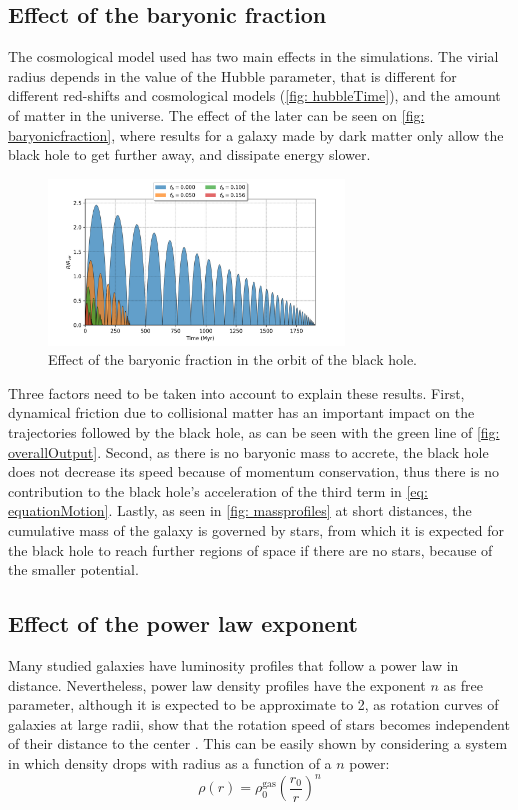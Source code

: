 	\subsection{Effect of the baryonic fraction}
	The cosmological model used has two main effects in the simulations. The virial radius depends in the value of the Hubble parameter, that is different for different red-shifts and cosmological models (\autoref{fig: hubbleTime}), and the amount of matter in the universe. The effect of the later can be seen on \autoref{fig: baryonicfraction}, where results for a galaxy made by dark matter only allow the black hole to get further away, and dissipate energy slower.
	\begin{figure}[h]
		\centering
		\includegraphics[width = 0.7\textwidth]{"../Files/Week 5/baryonic_fraction_comparison"}
		\caption{Effect of the baryonic fraction in the orbit of the black hole.}
		\label{fig: baryonicfraction}
	\end{figure}

	Three factors need to be taken into account to explain these results. First, dynamical friction due to collisional matter has an important impact on the trajectories followed by the black hole, as can be seen with the green line of \autoref{fig: overallOutput}. Second, as there is no baryonic mass to accrete, the black hole does not decrease its speed because of momentum conservation, thus there is no contribution to the black hole's acceleration of the third term in \autoref{eq: equationMotion}. Lastly, as seen in \autoref{fig: massprofiles} at short distances, the cumulative mass of the galaxy is governed by stars, from which it is expected for the black hole to reach further regions of space if there are no stars, because of the smaller potential.
		
	\subsection{Effect of the power law exponent}	
		Many studied galaxies have luminosity profiles that follow a power law in distance. Nevertheless, power law density profiles have the exponent $n$ as free parameter, although it is expected to be approximate to 2, as rotation curves of galaxies at large radii, show that the rotation speed of stars becomes independent of their distance to the center \cite{binney2011galactic}. This can be easily shown by considering a system in which density drops with radius as a function of a $n$ power:
		\begin{equation}
			\rho(r) = \rho_0^\text{gas}\left(\dfrac{r_0}{r}\right)^n
		\end{equation}
		
